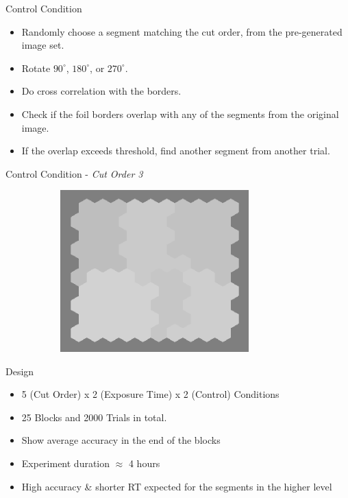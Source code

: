 \documentclass[10pt,xcolor=svgnames]{beamer} %
\begin{document}
\begin{frame}{Control Condition}
    \begin{itemize}
        \item Randomly choose a segment matching the cut order, from the pre-generated image set.
        \item Rotate  $90^\circ$, $180^\circ$, or $270^\circ$. 
        \item Do cross correlation with the borders.
        \item Check if the foil borders overlap with any of the segments from the original image.  
        \item If the overlap exceeds threshold, find another segment from another trial.
    \end{itemize}
\end{frame}

\begin{frame}[standout]{Control Condition - \textit{Cut Order 3}}
    \begin{figure}
        \centering
        \begin{subfigure}{0.4\textwidth}
        \centering
            \includegraphics[width=0.8\textwidth]{pictures/grid_init4.png}
        \end{subfigure}
        \hfill
        \begin{subfigure}{0.4\textwidth}
            \centering 
        \end{subfigure}
    \end{figure}
\end{frame}

\begin{frame}{Design}
    \begin{itemize}
        \item 5 (Cut Order) x 2 (Exposure Time) x 2 (Control) Conditions
        \item 25 Blocks and 2000 Trials in total.
        \item Show average accuracy in the end of the blocks
        \item Experiment duration $\approx$ 4 hours
        \item High accuracy \& shorter RT expected for the segments in the higher level
    \end{itemize}
\end{frame}
\end{document}
